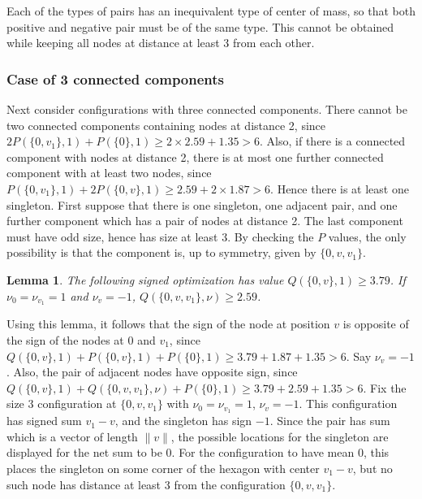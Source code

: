\documentclass[a4paper, 12pt, notitlepage]{amsart}
\newtheorem{lemma}[theorem]{Lemma}
\theoremstyle{remark}
\begin{document}
 Each of the types of pairs has an inequivalent type of center of mass, so that both positive and negative pair must be of the same type.  This cannot be obtained while keeping all nodes at distance at least 3 from each other.

 
\subsubsection*{Case of 3 connected components}
 Next consider configurations with three connected components.  There cannot be two connected components containing nodes at distance 2, since $2P(\{0,v_1\},1) + P(\{0\}, 1) \geq 2 \times 2.59 + 1.35 > 6$.  Also, if there is a connected component with nodes at distance 2, there is at most one further connected component with at least two nodes, since $P(\{0, v_1\},1) + 2P(\{0,v\},1) \geq 2.59 + 2 \times 1.87> 6$.  Hence there is at least one singleton.  First suppose that there is one singleton, one adjacent pair, and one further component which has a pair of nodes at distance 2.  The last component must have odd size, hence has size at least 3.  By checking the $P$ values, the only possibility is that the component is, up to symmetry, given by $\{0, v, v_1\}$.  
 \begin{lemma}
  The following signed optimization has value $Q(\{0,v\}, 1) \geq 3.79$. If $\nu_0 = \nu_{v_1} = 1$ and $\nu_v = -1$, $Q(\{0,v,v_1\}, \nu) \geq 2.59$.
 \end{lemma}
Using this lemma, it follows that the sign of the node at position $v$ is opposite of the sign of the nodes at 0 and $v_1$, since $Q(\{0,v\},1) + P(\{0,v\},1) + P(\{0\},1) \geq 3.79 + 1.87 + 1.35>6$. Say $\nu_{v}=-1$. Also, the pair of adjacent nodes have opposite sign, since $Q(\{0,v\}, 1) + Q(\{0,v,v_1\},\nu) + P(\{0\},1) \geq 3.79 + 2.59 + 1.35 > 6$. Fix the size 3 configuration at $\{0, v, v_1\}$ with $\nu_0 = \nu_{v_1} = 1$, $\nu_v = -1$.  This configuration has signed sum $v_1 - v$, and the singleton has sign $-1$.  Since the pair has sum which is a vector of length $\|v\|$, the possible locations for the singleton are displayed for the net sum to be 0.
For the configuration to have mean 0, this places the singleton on some corner of the hexagon with center $v_1-v$, but no such node has distance at least 3 from the configuration $\{0, v, v_1\}$.
\end{document}
